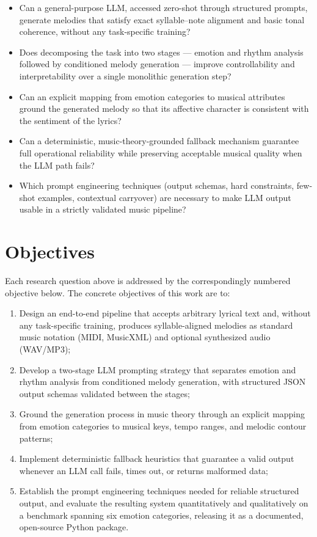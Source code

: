 \begin{itemize}
    \item[\textbf{RQ1.}] Can a general-purpose LLM, accessed zero-shot through
    structured prompts, generate melodies that satisfy exact syllable--note
    alignment and basic tonal coherence, without any task-specific training?
    \item[\textbf{RQ2.}] Does decomposing the task into two stages ---
    emotion and rhythm analysis followed by conditioned melody generation ---
    improve controllability and interpretability over a single monolithic
    generation step?
    \item[\textbf{RQ3.}] Can an explicit mapping from emotion categories to
    musical attributes ground the generated melody so that its affective
    character is consistent with the sentiment of the lyrics?
    \item[\textbf{RQ4.}] Can a deterministic, music-theory-grounded fallback
    mechanism guarantee full operational reliability while preserving
    acceptable musical quality when the LLM path fails?
    \item[\textbf{RQ5.}] Which prompt engineering techniques (output schemas,
    hard constraints, few-shot examples, contextual carryover) are necessary
    to make LLM output usable in a strictly validated music pipeline?
\end{itemize}

\section{Objectives}
\label{sec:objectives}

Each research question above is addressed by the correspondingly numbered
objective below. The concrete objectives of this work are to:

\begin{enumerate}
    \item Design an end-to-end pipeline that accepts arbitrary lyrical text
    and, without any task-specific training, produces syllable-aligned
    melodies as standard music notation (MIDI, MusicXML) and optional
    synthesized audio (WAV/MP3);
    \item Develop a two-stage LLM prompting strategy that separates emotion
    and rhythm analysis from conditioned melody generation, with structured
    JSON output schemas validated between the stages;
    \item Ground the generation process in music theory through an explicit
    mapping from emotion categories to musical keys, tempo ranges, and
    melodic contour patterns;
    \item Implement deterministic fallback heuristics that guarantee a valid
    output whenever an LLM call fails, times out, or returns malformed data;
    \item Establish the prompt engineering techniques needed for reliable
    structured output, and evaluate the resulting system quantitatively and
    qualitatively on a benchmark spanning six emotion categories, releasing
    it as a documented, open-source Python package.
\end{enumerate}


